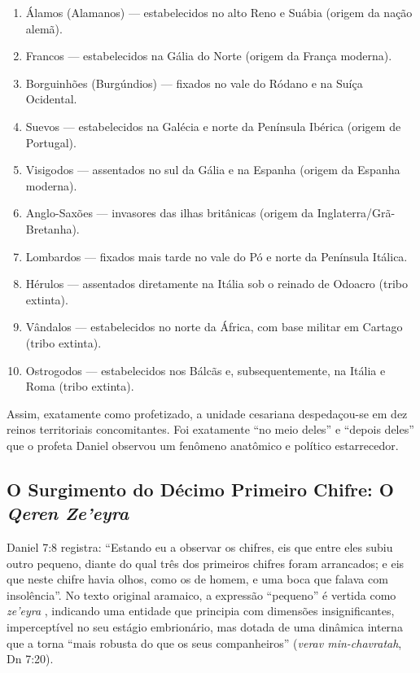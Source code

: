 \documentclass[11pt,a4paper,openany]{book}
\begin{document}
\begin{enumerate}
  \item Álamos (Alamanos) — estabelecidos no alto Reno e Suábia (origem da nação alemã).
  \item Francos — estabelecidos na Gália do Norte (origem da França moderna).
  \item Borguinhões (Burgúndios) — fixados no vale do Ródano e na Suíça Ocidental.
  \item Suevos — estabelecidos na Galécia e norte da Península Ibérica (origem de Portugal).
  \item Visigodos — assentados no sul da Gália e na Espanha (origem da Espanha moderna).
  \item Anglo-Saxões — invasores das ilhas britânicas (origem da Inglaterra/Grã-Bretanha).
  \item Lombardos — fixados mais tarde no vale do Pó e norte da Península Itálica.
  \item Hérulos — assentados diretamente na Itália sob o reinado de Odoacro (tribo extinta).
  \item Vândalos — estabelecidos no norte da África, com base militar em Cartago (tribo extinta).
  \item Ostrogodos — estabelecidos nos Bálcãs e, subsequentemente, na Itália e Roma (tribo extinta).
\end{enumerate}


Assim, exatamente como profetizado, a unidade cesariana despedaçou-se em dez reinos territoriais concomitantes. Foi exatamente ``no meio deles'' e ``depois deles'' que o profeta Daniel observou um fenômeno anatômico e político estarrecedor.



\subsection{O Surgimento do Décimo Primeiro Chifre: O \textit{Qeren Ze’eyra}}


Daniel 7:8 registra: ``Estando eu a observar os chifres, eis que entre eles subiu outro pequeno, diante do qual três dos primeiros chifres foram arrancados; e eis que neste chifre havia olhos, como os de homem, e uma boca que falava com insolência''. No texto original aramaico, a expressão ``pequeno'' é vertida como \textit{ze'eyra} , indicando uma entidade que principia com dimensões insignificantes, imperceptível no seu estágio embrionário, mas dotada de uma dinâmica interna que a torna ``mais robusta do que os seus companheiros'' (\textit{verav min-chavratah}, Dn 7:20).
\end{document}
